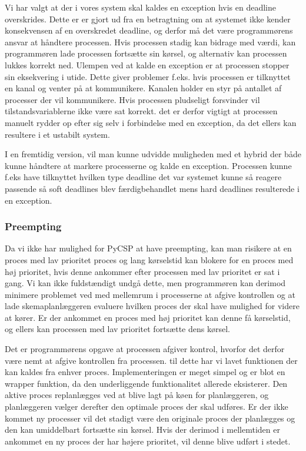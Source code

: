 Vi har valgt at der i vores system skal kaldes en exception hvis en deadline overskrides. Dette er er gjort ud fra en betragtning om at systemet ikke kender konsekvensen af en overskredet deadline, og derfor må det være programmørens ansvar at håndtere processen.  Hvis processen stadig kan bidrage med værdi, kan programmøren lade processen fortsætte sin kørsel, og alternativ kan processen lukkes korrekt ned. Ulempen ved at kalde en exception er at processen stopper sin eksekvering i utide. Dette giver problemer f.eks. hvis processen er tilknyttet en kanal og venter på at kommunikere.  Kanalen holder en styr på antallet af processer der vil kommunikere. Hvis processen pludseligt forsvinder vil tilstandsvariablerne ikke være sat korrekt. det er derfor vigtigt at processen manuelt rydder op efter sig selv i forbindelse med en exception, da det ellers kan resultere i et ustabilt system.

I en fremtidig version, vil man kunne udvidde muligheden med et hybrid der både kunne håndtere at markere processerne og kalde en exception. Processen kunne f.eks have  tilknyttet hvilken type deadline det var systemet kunne så reagere passende så soft deadlines blev færdigbehandlet mens hard deadlines resulterede i en exception.

\subsubsection{Preempting}

Da vi ikke har mulighed for PyCSP at have preempting, kan  man risikere at en proces med lav prioritet proces og lang kørselstid kan blokere for en proces med høj prioritet, hvis denne ankommer efter processen med lav prioritet er sat i gang. Vi kan ikke fuldstændigt undgå dette, men programmøren kan derimod minimere problemet ved med mellemrum i processerne at afgive kontrollen og at lade  skemaplanlæggeren evaluere hvilken proces der skal have mulighed for videre at kører. Er der ankommet en proces med høj prioritet kan denne få kørselstid, og ellers kan processen med lav prioritet fortsætte dens kørsel. 

Det er programmørens opgave at processen afgiver kontrol, hvorfor det  derfor være nemt at afgive kontrollen fra processen. til dette har vi lavet funktionen  der kan kaldes fra enhver proces. 
Implementeringen er meget simpel og er blot en wrapper funktion, da den underliggende funktionalitet allerede eksisterer. Den aktive proces replanlægges ved at blive lagt på køen for planlæggeren, og planlæggeren vælger derefter den optimale proces der skal udføres. Er der ikke kommet ny processer vil det stadigt være den originale proces der planlægges og den kan umiddelbart fortsætte sin kørsel. Hvis der derimod i mellemtiden er ankommet en ny proces der har højere prioritet, vil denne blive udført i stedet.




